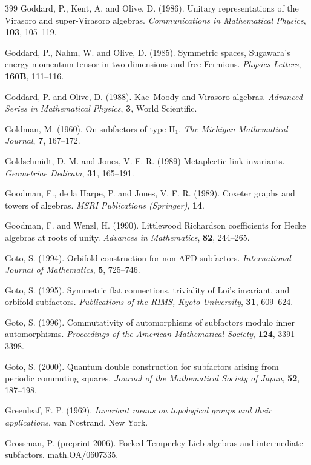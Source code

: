 \documentclass[12pt]{article}
\theoremstyle{plain}
\theoremstyle{definition}
\numberwithin{equation}{section}
\begin{document}
\begin{thebibliography} {399}
Goddard, P., Kent, A. and Olive, D. (1986).
Unitary representations of the Virasoro and 
super-Virasoro algebras.
{\em Communications in Mathematical Physics},
{\bf 103}, 105--119.

Goddard, P., Nahm, W. and Olive, D. (1985).
Symmetric spaces, Sugawara's energy momentum tensor in two
dimensions and free Fermions.
{\em Physics Letters}, {\bf 160B}, 111--116.

Goddard, P. and Olive, D. (1988).
Kac--Moody and Virasoro algebras.
{\em Advanced Series in Mathematical Physics},
{\bf 3}, World Scientific.

Goldman, M. (1960).
On subfactors of type II$_1$.
{\em The Michigan Mathematical Journal}, {\bf 7}, 167--172.

Goldschmidt, D. M. and Jones, V. F. R. (1989)
Metaplectic link invariants.
{\em Geometriae Dedicata}, {\bf 31}, 165--191.

Goodman, F., de la Harpe, P. and Jones, V. F. R. (1989).
Coxeter graphs and towers of algebras.
{\em MSRI Publications (Springer)}, {\bf 14}.

Goodman, F. and Wenzl, H. (1990).
Littlewood Richardson coefficients for Hecke 
algebras at roots of unity.
{\em Advances in Mathematics}, {\bf 82}, 244--265.

Goto, S. (1994).
Orbifold construction for non-AFD subfactors.
{\em International Journal of Mathematics}, {\bf 5}, 725--746.

Goto, S. (1995).
Symmetric flat connections, triviality of Loi's invariant, and
orbifold subfactors.
{\em Publications of the RIMS, Kyoto University},
{\bf 31}, 609--624.

Goto, S. (1996).
Commutativity of automorphisms of subfactors
modulo inner automorphisms.
{\em Proceedings of the American Mathematical Society},
{\bf 124}, 3391--3398.

Goto, S. (2000).
Quantum double construction for subfactors arising from
periodic commuting squares.
{\em Journal of the Mathematical Society of Japan},
{\bf 52}, 187--198.

Greenleaf, F. P. (1969).
{\em Invariant means on topological groups and their applications},
van Nostrand, New York.

Grossman, P. (preprint 2006).
Forked Temperley-Lieb algebras and intermediate subfactors. 
math.OA/0607335.


\end{thebibliography}
\end{document}
